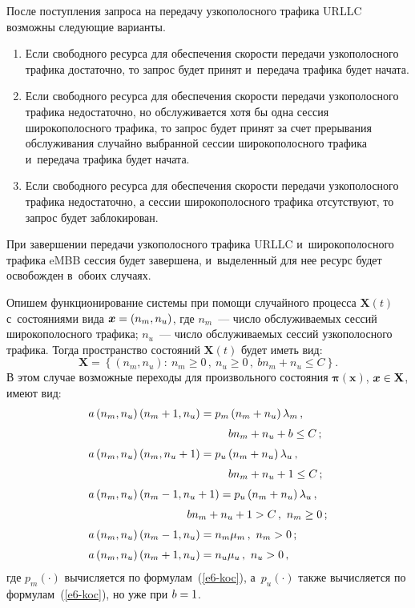 \begin{multicols}{2}
  После поступления запроса на передачу узкополосного трафика URLLC 
возможны сле\-ду\-ющие варианты.
  \begin{enumerate}
\item Если свободного ресурса для обеспечения скорости передачи 
узкополосного трафика достаточно, то запрос будет принят и~передача 
трафика будет начата.
\item Если свободного ресурса для обеспечения скорости передачи 
узкополосного трафика недостаточно, но обслуживается хотя бы одна сессия 
широкополосного трафика, то запрос \mbox{будет} принят за счет прерывания 
обслуживания случайно выбранной сессии широкополосного трафика 
и~передача трафика будет начата.
\item Если свободного ресурса для обеспечения скорости передачи 
узкополосного трафика недостаточно, а сессии широкополосного трафика 
отсутствуют, то запрос будет заблокирован.
\end{enumerate}

  При завершении передачи узкополосного трафика URLLC 
и~широкополосного трафика eMBB сессия будет завершена, и~выделенный для 
нее ресурс будет освобожден в~обоих случаях.
  
  Опишем функционирование системы при помощи случайного процесса 
$\mathbf{X}(t)$ с~состояниями вида $\bm{x}\hm= (n_m, n_u)$, где $n_m$~--- число 
обслуживаемых сессий широкополосного трафика; $n_u$~--- число 
обслуживаемых сессий узкополосного трафика. Тогда пространство состояний 
$\mathbf{X}(t)$ будет иметь вид:
  $$
  \mathbf{X}=\left\{ \left( n_m, n_u\right):\ n_m\geq0\,,\ n_u\geq 0\,,\ 
bn_m+n_u\leq C\right\}.
  $$
  В этом случае возможные переходы для произвольного состояния 
$\bm{\pi}(\bm{x})$, $\bm{x}\hm\in \mathbf{X}$, имеют вид:
  $$
   \begin{array}{l}
  a\left( n_m,n_u\right) \left( n_m+1,n_u\right)=p_m\left( 
n_m+n_u\right)\lambda_m\,,\\[6pt]
\hspace*{44mm} bn_m+n_u+b\leq C\,;\\[6pt]
  a\left( n_m, n_u\right) \left( n_m, n_u+1\right)=p_u\left( 
n_m+n_u\right)\lambda_u\,,\\[6pt]
\hspace*{44mm}  bn_m+n_u+1\leq C\,;\\[6pt]
  a\left( n_m, n_u\right) \left( n_m-1,n_u+1\right) =p_u\left( 
n_m+n_u\right)\lambda_u\,,\\[6pt]
\hspace*{31mm}  bn_m+n_u+1>C\,,\ n_m\geq0\,;\\[6pt]
  a\left( n_m, n_u\right) \left( n_m-1,n_u\right) =n_m\mu_m\,,\ n_m>0\,;\\[6pt]
  a\left( n_m, n_u\right) \left( n_m+1, n_u\right)= n_u\mu_u\,,\ n_u>0\,,
  \end{array}
  $$
где $p_m(\cdot)$ вычисляется по формулам~(\ref{e6-koc}), а~$p_u(\cdot)$ также 
вычисляется по формулам~(\ref{e6-koc}), но уже при $b\hm=1$.
  

\end{multicols}
